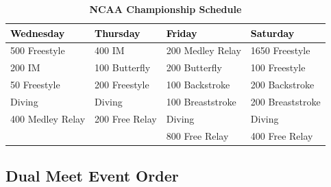 \begin{table}[H]
\centering
\caption*{\textbf{\textcolor{teamprimary}{NCAA Championship Schedule}}}
\renewcommand{\arraystretch}{1.3}
\begin{tabular}{p{3.5cm} p{3.5cm} p{3.5cm} p{3.5cm}}
\toprule
\rowcolor{teamprimary!25}
\textbf{\textcolor{black}{Wednesday}} & \textbf{\textcolor{black}{Thursday}} & \textbf{\textcolor{black}{Friday}} & \textbf{\textcolor{black}{Saturday}} \\
\midrule
\rowcolor{teamsecondary!12}
500 Freestyle & 400 IM & 200 Medley Relay & 1650 Freestyle \\
\rowcolor{teamprimary!8}
200 IM & 100 Butterfly & 200 Butterfly & 100 Freestyle \\
\rowcolor{teamsecondary!12}
50 Freestyle & 200 Freestyle & 100 Backstroke & 200 Backstroke \\
\rowcolor{teamprimary!8}
Diving & Diving & 100 Breaststroke & 200 Breaststroke \\
\rowcolor{teamsecondary!12}
400 Medley Relay & 200 Free Relay & Diving & Diving \\
\rowcolor{teamprimary!8}
 &  & 800 Free Relay & 400 Free Relay \\
\bottomrule
\end{tabular}
\end{table}




\subsection*{Dual Meet Event Order}

